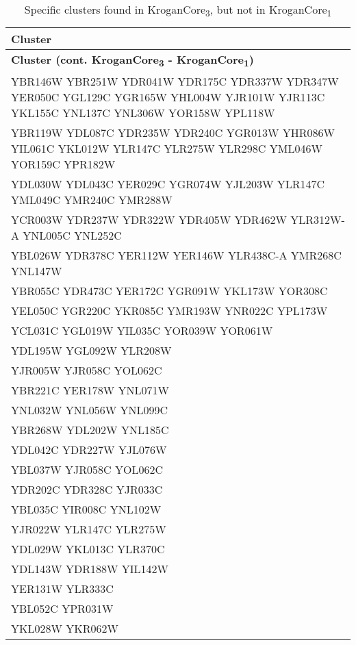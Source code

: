 \setlength{\extrarowheight}{2pt}
\renewcommand{\arraystretch}{1.2}
\begin{longtable}{| m{27em} |}
\caption{Specific clusters found in KroganCore\textsubscript{3}, but not in KroganCore\textsubscript{1}} \\
\hline
\textbf{Cluster} \\
\hline
\endfirsthead
\hline
\textbf{Cluster (cont. KroganCore\textsubscript{3} - KroganCore\textsubscript{1})} \\
\hline
\endhead
\hline
\endfoot
\hline
\endlastfoot
YBR146W YBR251W YDR041W YDR175C YDR337W YDR347W YER050C YGL129C YGR165W YHL004W YJR101W YJR113C YKL155C YNL137C YNL306W YOR158W YPL118W \\
\hline
YBR119W YDL087C YDR235W YDR240C YGR013W YHR086W YIL061C YKL012W YLR147C YLR275W YLR298C YML046W YOR159C YPR182W \\
\hline
YDL030W YDL043C YER029C YGR074W YJL203W YLR147C YML049C YMR240C YMR288W \\
\hline
YCR003W YDR237W YDR322W YDR405W YDR462W YLR312W-A YNL005C YNL252C \\
\hline
YBL026W YDR378C YER112W YER146W YLR438C-A YMR268C YNL147W \\
\hline
YBR055C YDR473C YER172C YGR091W YKL173W YOR308C \\
\hline
YEL050C YGR220C YKR085C YMR193W YNR022C YPL173W \\
\hline
YCL031C YGL019W YIL035C YOR039W YOR061W \\
\hline
YDL195W YGL092W YLR208W \\
\hline
YJR005W YJR058C YOL062C \\
\hline
YBR221C YER178W YNL071W \\
\hline
YNL032W YNL056W YNL099C \\
\hline
YBR268W YDL202W YNL185C \\
\hline
YDL042C YDR227W YJL076W \\
\hline
YBL037W YJR058C YOL062C \\
\hline
YDR202C YDR328C YJR033C \\
\hline
YBL035C YIR008C YNL102W \\
\hline
YJR022W YLR147C YLR275W \\
\hline
YDL029W YKL013C YLR370C \\
\hline
YDL143W YDR188W YIL142W \\
\hline
YER131W YLR333C \\
\hline
YBL052C YPR031W \\
\hline
YKL028W YKR062W \\

\end{longtable}
